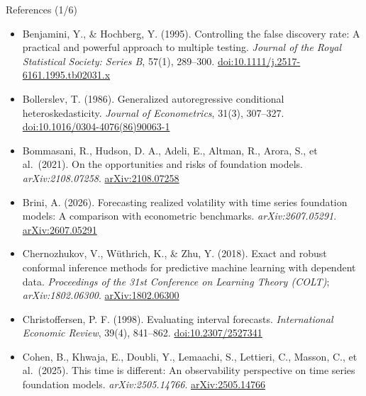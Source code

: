 \begin{frame}{References (1/6)}
\begin{itemize}
    \item Benjamini, Y., \& Hochberg, Y. (1995). Controlling the false discovery rate: A practical and powerful approach to multiple testing. \textit{Journal of the Royal Statistical Society: Series B}, 57(1), 289--300. \href{https://doi.org/10.1111/j.2517-6161.1995.tb02031.x}{doi:10.1111/j.2517-6161.1995.tb02031.x}
    \item Bollerslev, T. (1986). Generalized autoregressive conditional heteroskedasticity. \textit{Journal of Econometrics}, 31(3), 307--327. \href{https://doi.org/10.1016/0304-4076(86)90063-1}{doi:10.1016/0304-4076(86)90063-1}
    \item Bommasani, R., Hudson, D. A., Adeli, E., Altman, R., Arora, S., et al.\ (2021). On the opportunities and risks of foundation models. \textit{arXiv:2108.07258}. \href{https://arxiv.org/abs/2108.07258}{arXiv:2108.07258}
    \item Brini, A. (2026). Forecasting realized volatility with time series foundation models: A comparison with econometric benchmarks. \textit{arXiv:2607.05291}. \href{https://arxiv.org/abs/2607.05291}{arXiv:2607.05291}
    \item Chernozhukov, V., Wüthrich, K., \& Zhu, Y. (2018). Exact and robust conformal inference methods for predictive machine learning with dependent data. \textit{Proceedings of the 31st Conference on Learning Theory (COLT)}; \textit{arXiv:1802.06300}. \href{https://arxiv.org/abs/1802.06300}{arXiv:1802.06300}
    \item Christoffersen, P. F. (1998). Evaluating interval forecasts. \textit{International Economic Review}, 39(4), 841--862. \href{https://doi.org/10.2307/2527341}{doi:10.2307/2527341}
    \item Cohen, B., Khwaja, E., Doubli, Y., Lemaachi, S., Lettieri, C., Masson, C., et al.\ (2025). This time is different: An observability perspective on time series foundation models. \textit{arXiv:2505.14766}. \href{https://arxiv.org/abs/2505.14766}{arXiv:2505.14766}
\end{itemize}
\end{frame}

